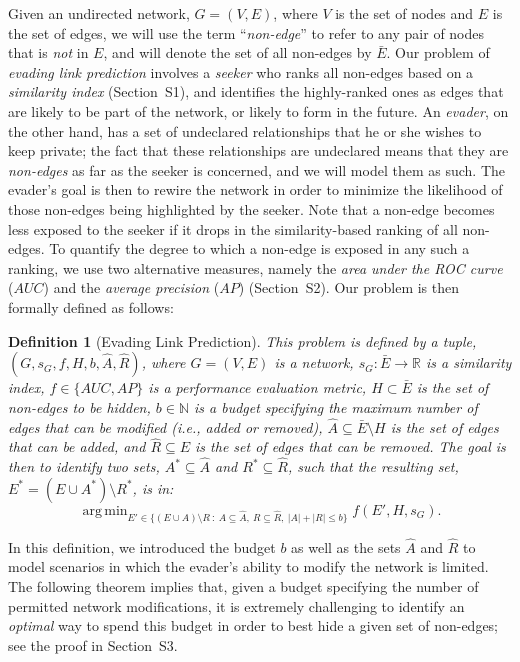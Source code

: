 \documentclass[twocolumn]{article}
\newtheorem{definition}{Definition}
\DeclareMathOperator*{\argmin}{arg\,min}
\newcommand{\R}{\mathbb{R}}
\newcommand{\N}{\mathbb{N}}
\newcommand{\ROC}{\mathit{AUC}}
\newcommand{\AP}{\mathit{AP}}
\newcommand{\ER}{\bar{E}}
\newcommand{\FA}{\widehat{A}}
\newcommand{\FR}{\widehat{R}}
\newcommand{\Add}{A^*}
\newcommand{\Remove}{R^*}
\newcommand{\Hide}{H}
\begin{document}
Given an undirected network, $G = (V, E)$, where $V$ is the set of nodes and $E$ is the set of edges,
we will use the term ``\emph{non-edge}'' to refer to any pair of nodes that is \emph{not} in $E$, and will denote the set of all non-edges by $\ER$.
Our problem of \textit{evading link prediction} involves a \emph{seeker} who ranks all non-edges based on a \emph{similarity index} (Section~S1), and identifies the highly-ranked ones as edges that are likely to be part of the network, or likely to form in the future. An \emph{evader}, on the other hand, has a set of undeclared relationships that he or she wishes to keep private; the fact  that these relationships are undeclared means that they are \textit{non-edges} as far as the seeker is concerned, and we will model them as such. The evader's goal is then to rewire the network in order to minimize the likelihood of those non-edges being highlighted by the seeker. Note that a non-edge becomes less exposed to the seeker if it drops in the similarity-based ranking of all non-edges. To quantify the degree to which a non-edge is exposed in any such a ranking, we use two alternative measures, namely the \emph{area under the ROC curve} ($\ROC$) \cite{fawcett2006introduction} and the \emph{average precision} ($\AP$) \cite{boyd2013area} (Section~S2). Our problem is then formally defined as follows:


\begin{definition}[Evading Link Prediction]\label{def:EvadingLinkPrediction}
This problem is defined by a tuple, $(G,s_G,f,\Hide,b,\FA,\FR)$, where $G=(V,E)$ is a network, $s_G: \ER \rightarrow \R$ is a similarity index, $f \in \{\ROC, \AP\}$ is a performance evaluation metric, $\Hide \subset \ER$ is the set of non-edges to be hidden, $b\in\N$ is a budget specifying the maximum number of edges that can be modified (i.e., added or removed), $\FA \subseteq \ER \setminus \Hide$ is the set of edges that can be added, and $\FR \subseteq E$ is the set of edges that can be removed.
The goal is then to identify two sets, $\Add \subseteq \FA$ and $\Remove \subseteq \FR$, such that the resulting set, $E^*=(E \cup \Add)\setminus \Remove$, is in:
$$
\argmin_{E'\in\big\{(E \cup A)\setminus R\ :\ A \subseteq \FA,\ R \subseteq \FR,\ |A|+|R| \leq b\big\}} f(E', \Hide, s_G).
$$
\end{definition}

In this definition, we introduced the budget $b$ as well as the sets $\FA$ and $\FR$ to model scenarios in which the evader's ability to modify the network is limited.
The following theorem implies that, given a budget specifying the number of permitted network modifications, it is extremely challenging to identify an \emph{optimal} way to spend this budget in order to best hide a given set of non-edges; see the proof in Section~S3.
\end{document}
